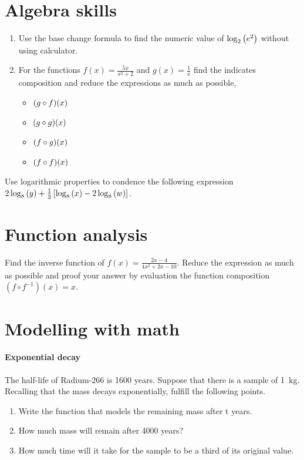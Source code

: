 \documentclass{tufte-handout} %
\begin{document}
\section{Algebra skills}

\begin{enumerate}
    \item Use the base change formula to find the numeric value of $\log_2\qty(e^2)$ without using calculator.
    \item For the functions $f(x) = \frac{5x}{x^2+2}$ and $g(x)=\frac{1}{x}$ find the indicates composition and reduce the expressions as much as possible,
        \begin{itemize}
            \item $\qty(g\circ f)(x)$
            \item $\qty(g\circ g)(x)$ 
            \item $\qty(f\circ g)(x)$
            \item $\qty(f\circ f)(x)$
        \end{itemize}
\end{enumerate}

Use logarithmic properties to condence the following expression $2\log_{8}\qty(y) + \frac{1}{3}\left[\log_{8}\qty(x)-2\log_{8}\qty(w)\right]$.

\section{Function analysis}

Find the inverse function of $f(x)=\frac{2x-4}{4x^2+2x-10}$. 
Reduce the expression as much as possible and proof your answer by evaluation the function composition $(f\circ f^{-1})(x)=x$.



\section{Modelling with math}

\paragraph{Exponential decay} The half-life of Radium-266 is 1600 years. 
Suppose that there is a sample of \SI{1}{\kilo\gram}. 
Recalling that the mass decays exponentially, fulfill the following points.
\begin{enumerate}
    \item Write the function that models the remaining mass after t years.
    \item How much mass will remain after 4000 years?
    \item How much time will it take for the sample to be a third of its original value.
\end{enumerate}
\end{document}
